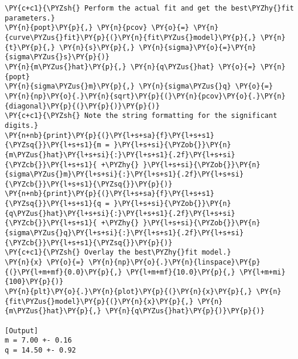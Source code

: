 \begin{Verbatim}[label=\makebox{\href{https://bitbucket.org/lbaldini/statnotes/src/master/snippets/fit\_linear.py}{https://bitbucket.org/.../fit\_linear.py}},commandchars=\\\{\}]
\PY{c+c1}{\PYZsh{} Perform the actual fit and get the best\PYZhy{}fit parameters.}
\PY{n}{popt}\PY{p}{,} \PY{n}{pcov} \PY{o}{=} \PY{n}{curve\PYZus{}fit}\PY{p}{(}\PY{n}{fit\PYZus{}model}\PY{p}{,} \PY{n}{t}\PY{p}{,} \PY{n}{s}\PY{p}{,} \PY{n}{sigma}\PY{o}{=}\PY{n}{sigma\PYZus{}s}\PY{p}{)}
\PY{n}{m\PYZus{}hat}\PY{p}{,} \PY{n}{q\PYZus{}hat} \PY{o}{=} \PY{n}{popt}
\PY{n}{sigma\PYZus{}m}\PY{p}{,} \PY{n}{sigma\PYZus{}q} \PY{o}{=} \PY{n}{np}\PY{o}{.}\PY{n}{sqrt}\PY{p}{(}\PY{n}{pcov}\PY{o}{.}\PY{n}{diagonal}\PY{p}{(}\PY{p}{)}\PY{p}{)}
\PY{c+c1}{\PYZsh{} Note the string formatting for the significant digits.}
\PY{n+nb}{print}\PY{p}{(}\PY{l+s+sa}{f}\PY{l+s+s1}{\PYZsq{}}\PY{l+s+s1}{m = }\PY{l+s+si}{\PYZob{}}\PY{n}{m\PYZus{}hat}\PY{l+s+si}{:}\PY{l+s+s1}{.2f}\PY{l+s+si}{\PYZcb{}}\PY{l+s+s1}{ +\PYZhy{} }\PY{l+s+si}{\PYZob{}}\PY{n}{sigma\PYZus{}m}\PY{l+s+si}{:}\PY{l+s+s1}{.2f}\PY{l+s+si}{\PYZcb{}}\PY{l+s+s1}{\PYZsq{}}\PY{p}{)}
\PY{n+nb}{print}\PY{p}{(}\PY{l+s+sa}{f}\PY{l+s+s1}{\PYZsq{}}\PY{l+s+s1}{q = }\PY{l+s+si}{\PYZob{}}\PY{n}{q\PYZus{}hat}\PY{l+s+si}{:}\PY{l+s+s1}{.2f}\PY{l+s+si}{\PYZcb{}}\PY{l+s+s1}{ +\PYZhy{} }\PY{l+s+si}{\PYZob{}}\PY{n}{sigma\PYZus{}q}\PY{l+s+si}{:}\PY{l+s+s1}{.2f}\PY{l+s+si}{\PYZcb{}}\PY{l+s+s1}{\PYZsq{}}\PY{p}{)}
\PY{c+c1}{\PYZsh{} Overlay the best\PYZhy{}fit model.}
\PY{n}{x} \PY{o}{=} \PY{n}{np}\PY{o}{.}\PY{n}{linspace}\PY{p}{(}\PY{l+m+mf}{0.0}\PY{p}{,} \PY{l+m+mf}{10.0}\PY{p}{,} \PY{l+m+mi}{100}\PY{p}{)}
\PY{n}{plt}\PY{o}{.}\PY{n}{plot}\PY{p}{(}\PY{n}{x}\PY{p}{,} \PY{n}{fit\PYZus{}model}\PY{p}{(}\PY{n}{x}\PY{p}{,} \PY{n}{m\PYZus{}hat}\PY{p}{,} \PY{n}{q\PYZus{}hat}\PY{p}{)}\PY{p}{)}

[Output]
m = 7.00 +- 0.16
q = 14.50 +- 0.92
\end{Verbatim}